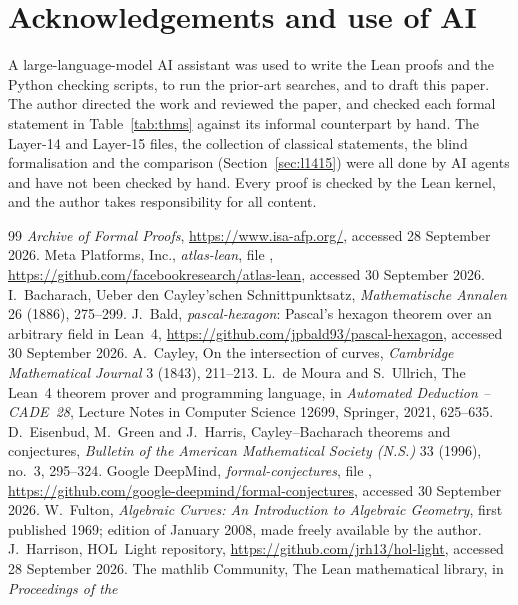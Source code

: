 \documentclass[11pt]{article}
\theoremstyle{definition}
\theoremstyle{remark}
\begin{document}
\section*{Acknowledgements and use of AI}
A large-language-model AI assistant was used to write the Lean proofs and the Python checking
scripts, to run the prior-art searches, and to draft this paper. The author directed the work and
reviewed the paper, and checked each formal statement in Table~\ref{tab:thms} against its
informal counterpart by hand.
The Layer-14 and Layer-15 files, the collection of classical statements, the blind formalisation and
the comparison (Section~\ref{sec:l1415}) were all done by AI agents and have not been checked by hand.
Every proof is checked by the Lean kernel, and the author takes responsibility for all content.

\begin{thebibliography}{99}\sloppy
{} \emph{Archive of Formal Proofs}, \url{https://www.isa-afp.org/}, accessed 28
September 2026.
 Meta Platforms, Inc., \emph{atlas-lean}, file
,
\url{https://github.com/facebookresearch/atlas-lean}, accessed 30 September 2026.
 I.~Bacharach, Ueber den Cayley'schen Schnittpunktsatz, \emph{Mathematische
Annalen} 26 (1886), 275--299.
 J.~Bald, \emph{pascal-hexagon}: Pascal's hexagon theorem over an arbitrary
field in Lean~4, \url{https://github.com/jpbald93/pascal-hexagon}, accessed 30 September 2026.
 A.~Cayley, On the intersection of curves, \emph{Cambridge Mathematical Journal}
3 (1843), 211--213.
 L.~de Moura and S.~Ullrich, The Lean~4 theorem prover and programming language, in
\emph{Automated Deduction -- CADE~28}, Lecture Notes in Computer Science 12699, Springer, 2021,
625--635.
 D.~Eisenbud, M.~Green and J.~Harris, Cayley--Bacharach theorems and conjectures,
\emph{Bulletin of the American Mathematical Society (N.S.)} 33 (1996), no.~3, 295--324.
 Google DeepMind, \emph{formal-conjectures}, file
,
\url{https://github.com/google-deepmind/formal-conjectures}, accessed 30 September 2026.
 W.~Fulton, \emph{Algebraic Curves: An Introduction to Algebraic Geometry},
first published 1969; edition of January 2008, made freely available by the author.
 J.~Harrison, HOL~Light repository, \url{https://github.com/jrh13/hol-light},
accessed 28 September 2026.
 The mathlib Community, The Lean mathematical library, in \emph{Proceedings of the
}
\end{thebibliography}
\end{document}
